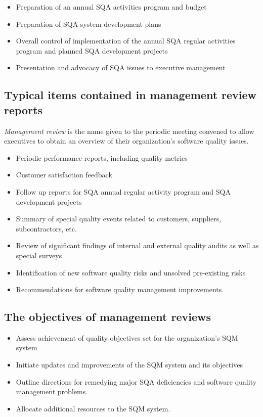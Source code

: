 \documentclass{article}
\begin{document}
\begin{itemize}
  \item Preparation of an annual SQA activities program and budget
  \item Preparation of SQA system development plans
  \item Overall control of implementation of the annual SQA regular activities program and planned SQA development projects
  \item Presentation and advocacy of SQA issues to executive management
\end{itemize}

\subsection{Typical items contained in management review reports}

\begin{flushleft}
\textit{Management review} is the name given to the periodic meeting convened to allow executives to obtain an overview of their organization’s software quality issues.
\begin{itemize}
  \item Periodic performance reports, including quality metrics
  \item Customer satisfaction feedback
  \item Follow up reports for SQA annual regular activity program and SQA development projects
  \item Summary of special quality events related to customers, suppliers, subcontractors, etc.
  \item Review of significant findings of internal and external quality audits as well as special surveys
  \item Identification of new software quality risks and unsolved pre-existing risks
  \item Recommendations for software quality management improvements.
\end{itemize}
\end{flushleft}

\subsection{The objectives of management reviews}

\begin{itemize}
  \item Assess achievement of quality objectives set for the organization’s SQM system
  \item Initiate updates and improvements of the SQM system and its objectives
  \item Outline directions for remedying major SQA deficiencies and software quality management problems.
  \item Allocate additional resources to the SQM system.
\end{itemize}
\end{document}
